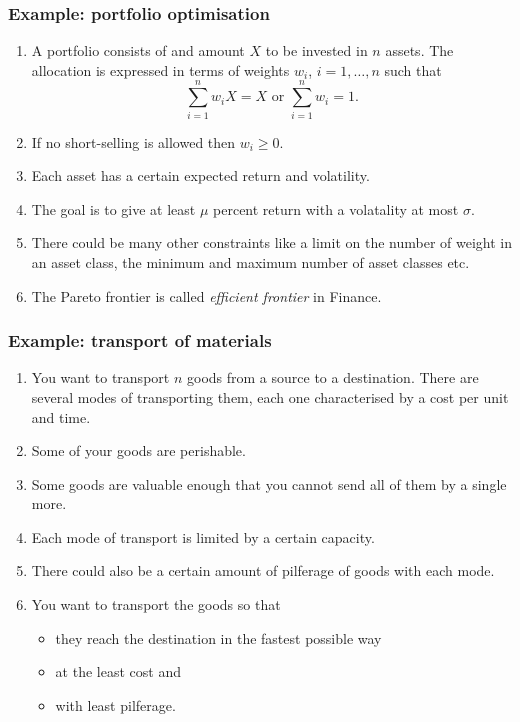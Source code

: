 \documentclass{beamer}
\begin{document}
\begin{frame}
\frametitle{Example: portfolio optimisation}
\begin{enumerate}
\item A portfolio consists of and amount $X$ to be invested in $n$ assets. The
allocation is expressed in terms of weights $w_i$, $i = 1, \ldots, n$ such that
\begin{equation}\label{e16}
\sum_{i=1}^n w_iX = X \text{ or } \sum_{i=1}^n w_i = 1.
\end{equation}
\item If no short-selling is allowed then $w_i \ge 0$.
\item Each asset has a certain expected return and volatility.
\item The goal is to give at least $\mu$ percent return with a volatality at
most $\sigma$. 
\item There could be many other constraints like a limit on the number of weight
in an asset class, the minimum and maximum number of asset classes etc.
\item The Pareto frontier is called \emph{efficient frontier} in Finance.
\end{enumerate}
\end{frame}

\begin{frame}
\frametitle{Example: transport of materials}
\begin{enumerate}
\item You want to transport $n$ goods from a source to a destination. There
are several modes of transporting them, each one characterised by a cost 
per unit and time.
\item Some of your goods are perishable. 
\item Some goods are valuable enough that you cannot send all of them by a
single more.
\item Each mode of transport is limited by a certain capacity.
\item There could also be a certain amount of pilferage of goods with each mode.
\item You want to transport the goods so that
\begin{itemize}
\item they reach the destination in the fastest possible way
\item at the least cost and
\item with least pilferage.
\end{itemize}
\end{enumerate}
\end{frame}
\end{document}
